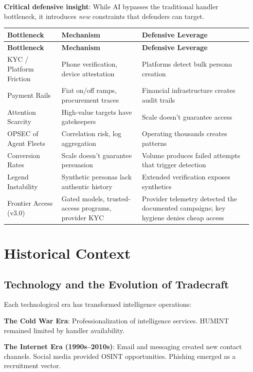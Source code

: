 \documentclass[11pt,letterpaper]{article}
\begin{document}
\textbf{Critical defensive insight}: While AI bypasses the traditional handler bottleneck, it introduces \textit{new} constraints that defenders can target.

{\small
\begin{longtable}{L{3cm}L{4.5cm}L{5cm}}
\toprule
\textbf{Bottleneck} & \textbf{Mechanism} & \textbf{Defensive Leverage} \\
\midrule
\endfirsthead
\toprule
\textbf{Bottleneck} & \textbf{Mechanism} & \textbf{Defensive Leverage} \\
\midrule
\endhead
KYC / Platform Friction & Phone verification, device attestation & Platforms detect bulk persona creation \\*
Payment Rails & Fiat on/off ramps, procurement traces & Financial infrastructure creates audit trails \\
Attention Scarcity & High-value targets have gatekeepers & Scale doesn't guarantee access \\
OPSEC of Agent Fleets & Correlation risk, log aggregation & Operating thousands creates patterns \\
Conversion Rates & Scale doesn't guarantee persuasion & Volume produces failed attempts that trigger detection \\
Legend Instability & Synthetic personas lack authentic history & Extended verification exposes synthetics \\*
Frontier Access (v3.0) & Gated models, trusted-access programs, provider KYC & Provider telemetry detected the documented campaigns; key hygiene denies cheap access \\
\bottomrule
\end{longtable}}

\section{Historical Context}\label{sec:history}

\subsection{Technology and the Evolution of Tradecraft}

Each technological era has transformed intelligence operations:

\textbf{The Cold War Era}: Professionalization of intelligence services. HUMINT remained limited by handler availability.

\textbf{The Internet Era (1990s--2010s)}: Email and messaging created new contact channels. Social media provided OSINT opportunities. Phishing emerged as a recruitment vector.
\end{document}
